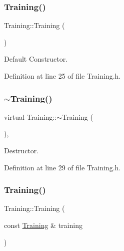 \subsubsection{\texorpdfstring{Training()}{Training()}\hspace{0.1cm}{\footnotesize\ttfamily [1/4]}}
{\footnotesize\ttfamily Training\+::\+Training (\begin{DoxyParamCaption}{ }\end{DoxyParamCaption})\hspace{0.3cm}{\ttfamily [inline]}}



Default Constructor. 



Definition at line 25 of file Training.\+h.

\hypertarget{class_training_a4a40f758a773c3c63d8558eaa78b1abd}{}\label{class_training_a4a40f758a773c3c63d8558eaa78b1abd} 
\subsubsection{\texorpdfstring{$\sim$\+Training()}{~Training()}}
{\footnotesize\ttfamily virtual Training\+::$\sim$\+Training (\begin{DoxyParamCaption}{ }\end{DoxyParamCaption})\hspace{0.3cm}{\ttfamily [inline]}, {\ttfamily [virtual]}}



Destructor. 



Definition at line 29 of file Training.\+h.

\hypertarget{class_training_a923c500458737327f874067ffc7ca1c9}{}\label{class_training_a923c500458737327f874067ffc7ca1c9} 
\subsubsection{\texorpdfstring{Training()}{Training()}\hspace{0.1cm}{\footnotesize\ttfamily [2/4]}}
{\footnotesize\ttfamily Training\+::\+Training (\begin{DoxyParamCaption}\item[{const \hyperlink{class_training}{Training} \&}]{training }\end{DoxyParamCaption})}



